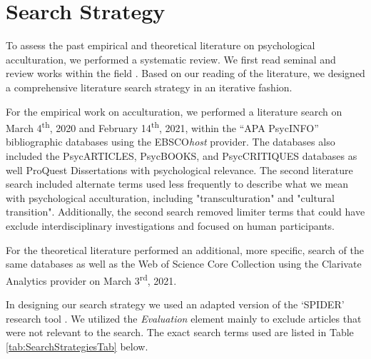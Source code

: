 \documentclass[man, 12pt, a4paper, mask]{apa7}
\begin{document}

\printbibliography

\appendix

\section{Search Strategy}
\label{app:AppendixSearchStrategy}

To assess the past empirical and theoretical literature on psychological acculturation, we performed a systematic review. We first read seminal and review works within the field \citep[including,][]{Ward2019, Berry1997b, Berry2003, Szapocznik1978, Sam2006a, Rudmin2003a}. Based on our reading of the literature, we designed a comprehensive literature search strategy in an iterative fashion. 

For the empirical work on acculturation, we performed a literature search on March 4\textsuperscript{th}, 2020 and February 14\textsuperscript{th}, 2021, within the ``APA PsycINFO'' bibliographic databases using the EBSCO\textit{host} provider. The databases also included the PsycARTICLES, PsycBOOKS, and PsycCRITIQUES databases as well ProQuest Dissertations with psychological relevance. The second literature search included alternate terms used less frequently to describe what we mean with psychological acculturation, including "transculturation" and "cultural transition". Additionally, the second search removed limiter terms that could have exclude interdisciplinary investigations and focused on human participants.

For the theoretical literature performed an additional, more specific, search of the same databases as well as the Web of Science Core Collection using the Clarivate Analytics provider on March 3\textsuperscript{rd}, 2021.

In designing our search strategy we used an adapted version of the `SPIDER' research tool \citep[e.g.,][]{Cooke2012}. We utilized the \textit{Evaluation} element mainly to exclude articles that were not relevant to the search. The exact search terms used are listed in Table \ref{tab:SearchStrategiesTab} below.


\end{document}
